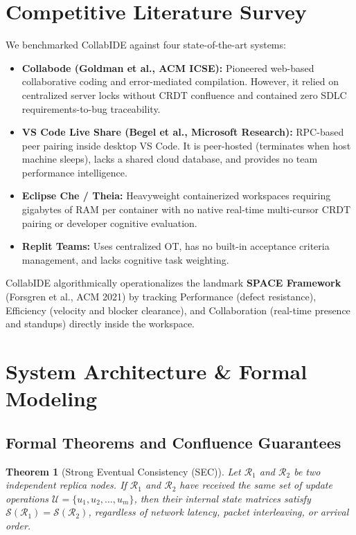 \documentclass[conference]{IEEEtran}
\begin{document}
\section{Competitive Literature Survey}
We benchmarked CollabIDE against four state-of-the-art systems:
\begin{itemize}
    \item \textbf{Collabode (Goldman et al., ACM ICSE):} Pioneered web-based collaborative coding and error-mediated compilation. However, it relied on centralized server locks without CRDT confluence and contained zero SDLC requirements-to-bug traceability.
    \item \textbf{VS Code Live Share (Begel et al., Microsoft Research):} RPC-based peer pairing inside desktop VS Code. It is peer-hosted (terminates when host machine sleeps), lacks a shared cloud database, and provides no team performance intelligence.
    \item \textbf{Eclipse Che / Theia:} Heavyweight containerized workspaces requiring gigabytes of RAM per container with no native real-time multi-cursor CRDT pairing or developer cognitive evaluation.
    \item \textbf{Replit Teams:} Uses centralized OT, has no built-in acceptance criteria management, and lacks cognitive task weighting.
\end{itemize}

CollabIDE algorithmically operationalizes the landmark \textbf{SPACE Framework} (Forsgren et al., ACM 2021) by tracking Performance (defect resistance), Efficiency (velocity and blocker clearance), and Collaboration (real-time presence and standups) directly inside the workspace.

\section{System Architecture \& Formal Modeling}

\subsection{Formal Theorems and Confluence Guarantees}
\newtheorem{theorem}{Theorem}
\newtheorem{lemma}{Lemma}

\begin{theorem}[Strong Eventual Consistency (SEC)]
Let $\mathcal{R}_1$ and $\mathcal{R}_2$ be two independent replica nodes. If $\mathcal{R}_1$ and $\mathcal{R}_2$ have received the same set of update operations $\mathcal{U} = \{u_1, u_2, \dots, u_m\}$, then their internal state matrices satisfy $\mathcal{S}(\mathcal{R}_1) = \mathcal{S}(\mathcal{R}_2)$, regardless of network latency, packet interleaving, or arrival order.
\end{theorem}
\end{document}
